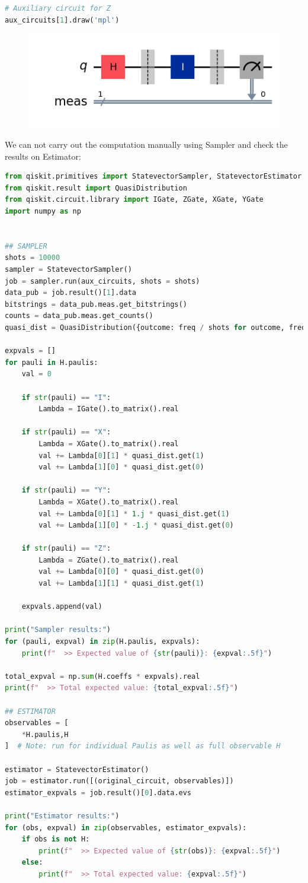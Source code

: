 \documentclass[12pt, oneside]{book}
\theoremstyle{definition}
\theoremstyle{definition}
\theoremstyle{remark}
\begin{document}
\begin{lstlisting}[language=Python]
# Auxiliary circuit for Z
aux_circuits[1].draw('mpl')
\end{lstlisting}
\begin{figure}[H]
    \centering
    \includegraphics[width=0.5\linewidth]{../images/aux_circ2.png}
\end{figure}
We can not carry out the computation manually using Sampler and check the results on Estimator:

\begin{lstlisting}[language=Python]
from qiskit.primitives import StatevectorSampler, StatevectorEstimator
from qiskit.result import QuasiDistribution
from qiskit.circuit.library import IGate, ZGate, XGate, YGate
import numpy as np


## SAMPLER
shots = 10000
sampler = StatevectorSampler()
job = sampler.run(aux_circuits, shots = shots)
data_pub = job.result()[1].data
bitstrings = data_pub.meas.get_bitstrings()
counts = data_pub.meas.get_counts()
quasi_dist = QuasiDistribution({outcome: freq / shots for outcome, freq in counts.items()})

expvals = []
for pauli in H.paulis:
    val = 0
    
    if str(pauli) == "I":
        Lambda = IGate().to_matrix().real
    
    if str(pauli) == "X":
        Lambda = XGate().to_matrix().real
        val += Lambda[0][1] * quasi_dist.get(1)
        val += Lambda[1][0] * quasi_dist.get(0)
    
    if str(pauli) == "Y":
        Lambda = XGate().to_matrix().real
        val += Lambda[0][1] * 1.j * quasi_dist.get(1)
        val += Lambda[1][0] * -1.j * quasi_dist.get(0)

    if str(pauli) == "Z":
        Lambda = ZGate().to_matrix().real
        val += Lambda[0][0] * quasi_dist.get(0)
        val += Lambda[1][1] * quasi_dist.get(1)
    
    expvals.append(val)

print("Sampler results:")
for (pauli, expval) in zip(H.paulis, expvals):
    print(f"  >> Expected value of {str(pauli)}: {expval:.5f}")

total_expval = np.sum(H.coeffs * expvals).real
print(f"  >> Total expected value: {total_expval:.5f}")

## ESTIMATOR
observables = [
    *H.paulis,H
]  # Note: run for individual Paulis as well as full observable H

estimator = StatevectorEstimator()
job = estimator.run([(original_circuit, observables)])
estimator_expvals = job.result()[0].data.evs

print("Estimator results:")
for (obs, expval) in zip(observables, estimator_expvals):
    if obs is not H:
        print(f"  >> Expected value of {str(obs)}: {expval:.5f}")
    else:
        print(f"  >> Total expected value: {expval:.5f}")
\end{lstlisting}
\end{document}
